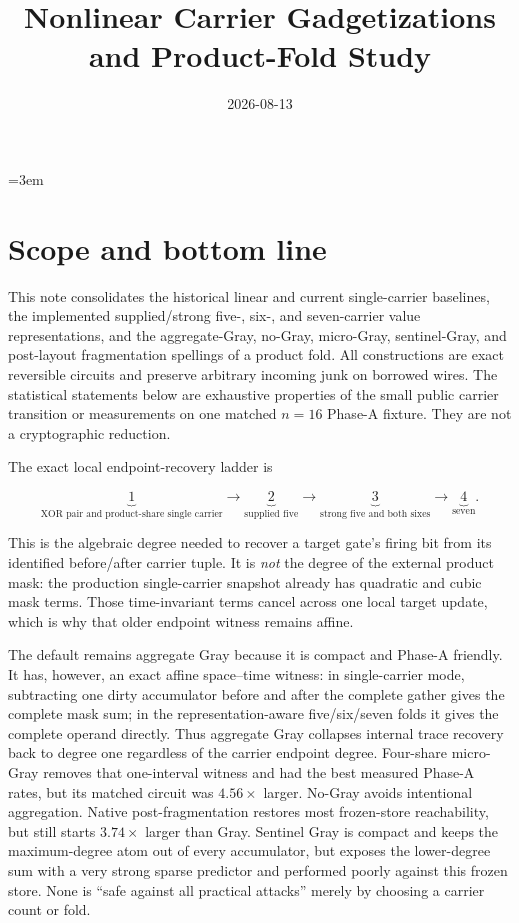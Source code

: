 \documentclass[11pt]{article}
\title{Nonlinear Carrier Gadgetizations and Product-Fold Study}
\author{}
\date{2026-08-13}
\begin{document}
\emergencystretch=3em
\maketitle

\section{Scope and bottom line}

This note consolidates the historical linear and current single-carrier
baselines, the implemented supplied/strong five-, six-, and seven-carrier
value representations, and the aggregate-Gray, no-Gray, micro-Gray,
sentinel-Gray, and post-layout fragmentation spellings of a product fold.  All
constructions are exact reversible circuits and preserve arbitrary incoming
junk on borrowed wires.  The statistical statements below are exhaustive
properties of the small public carrier transition or measurements on one
matched $n=16$ Phase-A fixture.  They are not a cryptographic reduction.

The exact local endpoint-recovery ladder is

\[
\underbrace{1}_{\text{XOR pair and product-share single carrier}}
\longrightarrow
\underbrace{2}_{\text{supplied five}}
\longrightarrow
\underbrace{3}_{\text{strong five and both sixes}}
\longrightarrow
\underbrace{4}_{\text{seven}} .
\]

This is the algebraic degree needed to recover a target gate's firing bit from
its identified before/after carrier tuple.  It is \emph{not} the degree of the
external product mask: the production single-carrier snapshot already has
quadratic and cubic mask terms.  Those time-invariant terms cancel across one
local target update, which is why that older endpoint witness remains affine.

The default remains aggregate Gray because it is compact and Phase-A friendly.
It has, however, an exact affine space--time witness: in single-carrier mode,
subtracting one dirty accumulator before and after the complete gather gives
the complete mask sum; in the representation-aware five/six/seven folds it
gives the complete operand directly.  Thus aggregate Gray collapses internal
trace recovery back to degree one regardless of the carrier endpoint degree.
Four-share micro-Gray removes that one-interval witness and had the best
measured Phase-A rates, but its matched circuit was $4.56\times$ larger.
No-Gray avoids intentional aggregation.  Native post-fragmentation restores
most frozen-store reachability, but still starts $3.74\times$ larger than Gray.
Sentinel Gray is compact and keeps the maximum-degree atom out of every
accumulator, but exposes the lower-degree sum with a very strong sparse
predictor and performed poorly against this frozen store.  None is ``safe
against all practical attacks'' merely by choosing a carrier count or fold.
\end{document}
